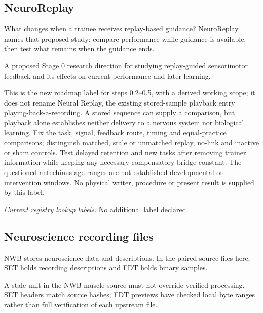 \subsection*{NeuroReplay}
\noindent What changes when a trainee receives replay-based guidance? NeuroReplay names that proposed study: compare performance while guidance is available, then test what remains when the guidance ends.\par
\noindent A proposed Stage 0 research direction for studying replay-guided sensorimotor feedback and its effects on current performance and later learning.\par
\noindent This is the new roadmap label for steps 0.2–0.5, with a derived working scope; it does not rename Neural Replay, the existing stored-sample playback entry playing-back-a-recording. A stored sequence can supply a comparison, but playback alone establishes neither delivery to a nervous system nor biological learning. Fix the task, signal, feedback route, timing and equal-practice comparisons; distinguish matched, stale or unmatched replay, no-link and inactive or sham controls. Test delayed retention and new tasks after removing trainer information while keeping any necessary compensatory bridge constant. The questioned antechinus age ranges are not established developmental or intervention windows. No physical writer, procedure or present result is supplied by this label.\par

\noindent\textit{Current registry lookup labels:} No additional label declared.\par

\begin{samepage}
\subsection*{Neuroscience recording files}
\noindent NWB stores neuroscience data and descriptions. In the paired source files here, SET holds recording descriptions and FDT holds binary samples.\par
\end{samepage}
\begin{samepage}
\noindent A stale unit in the NWB muscle source must not override verified processing. SET headers match source hashes; FDT previews have checked local byte ranges rather than full verification of each upstream file.\par\nopagebreak[4]

\end{samepage}


